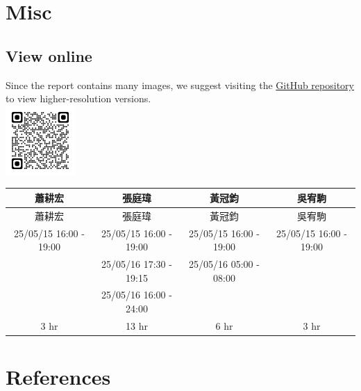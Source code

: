 \documentclass[12pt]{article}
\begin{document}


    \section{Misc}

    \subsection{View online}
    Since the report contains many images, we suggest visiting the \href{https://github.com/CSIEHaTerX/Dr.UML/}{GitHub repository} to view higher-resolution versions.\\
    \includegraphics[]{assets/repoQRCode.png}

    \begin{CJK*}{UTF8}{bsmi}
        \begin{longtable}{c|c|c|c|}
            \hline
            蕭耕宏 & 張庭瑋 & 黃冠鈞 & 吳宥駒 \\
            \hline
            \endfirsthead
            \hline
            蕭耕宏 & 張庭瑋 & 黃冠鈞 & 吳宥駒 \\
            \hline
            \endhead
            \hline
            25/05/15 16:00 - 19:00 & 25/05/15 16:00 - 19:00 & 25/05/15 16:00 - 19:00 & 25/05/15 16:00 - 19:00 \\
            \hline
            & 25/05/16 17:30 - 19:15 & 25/05/16 05:00 - 08:00 &                        \\
            \hline
            & 25/05/16 16:00 - 24:00 &                        &                        \\
            \hline
            3 hr                   & 13 hr                  & 6 hr                   & 3 hr                   \\
            \hline
        \end{longtable}
    \end{CJK*}



    \section*{References}

    \nocite{Siepe2024}
    \printbibliography[heading=none]
\end{document}
